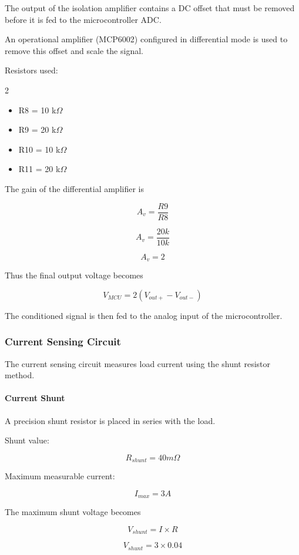 The output of the isolation amplifier contains a DC offset that must be removed before it is fed to the microcontroller ADC.

An operational amplifier (MCP6002) configured in differential mode is used to remove this offset and scale the signal.

Resistors used:

\begin{multicols}{2}
\begin{itemize}
\item R8 = 10 k$\Omega$
\item R9 = 20 k$\Omega$
\item R10 = 10 k$\Omega$
\item R11 = 20 k$\Omega$
\end{itemize}
\end{multicols}

The gain of the differential amplifier is

\[
A_v = \frac{R9}{R8}
\]

\[
A_v = \frac{20k}{10k}
\]

\[
A_v = 2
\]

Thus the final output voltage becomes

\[
V_{MCU} = 2(V_{out+} - V_{out-})
\]

The conditioned signal is then fed to the analog input of the microcontroller.

\subsubsection{Current Sensing Circuit}

The current sensing circuit measures load current using the shunt resistor method.

\paragraph{Current Shunt}

A precision shunt resistor is placed in series with the load.

Shunt value:

\[
R_{shunt} = 40m\Omega
\]

Maximum measurable current:

\[
I_{max} = 3A
\]

The maximum shunt voltage becomes

\[
V_{shunt} = I \times R
\]

\[
V_{shunt} = 3 \times 0.04
\]

